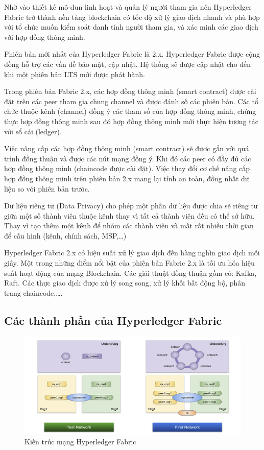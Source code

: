 Nhờ vào thiết kế mô-đun linh hoạt và quản lý người tham gia nên Hyperledger Fabric trở thành nền tảng blockchain có tốc độ xử lý giao dịch nhanh và phù hợp với tổ chức muốn kiểm soát danh tính người tham gia, và xác minh các giao dịch với hợp đồng thông minh.

Phiên bản mới nhất của Hyperledger Fabric là 2.x. Hyperledger Fabric được cộng đồng hỗ trợ các vấn đề bảo mật, cập nhật. Hệ thống sẽ được cập nhật cho đến khi một phiên bản LTS mới được phát hành.


Trong phiên bản Fabric 2.x, các hợp đồng thông minh (smart contract) được cài đặt trên các peer tham gia chung channel và được đánh số các phiên bản. Các tổ chức thuộc kênh (channel) đồng ý các tham số của hợp đồng thông minh, chứng thực hợp đồng thông minh sau đó hợp đồng thông minh mới thực hiện tương tác với sổ cái (ledger).

Việc nâng cấp các hợp đồng thông minh (smart contract) sẽ được gắn với quá trình đồng thuận và được các nút mạng đồng ý. Khi đó các peer có đầy đủ các hợp đồng thông minh (chaincode được cài đặt). Việc thay đổi cơ chế nâng cấp hợp đồng thông minh trên phiên bản 2.x mang lại tính an toàn, đồng nhất dữ liệu so với phiên bản trước.

Dữ liệu riêng tư (Data Privacy) cho phép một phần dữ liệu được chia sẽ riêng tư giữa một số thành viên thuộc kênh thay vì tất cả thành viên đều có thể sở hữu. Thay vì tạo thêm một kênh để nhóm các thành viên và mất rất nhiều thời gian để cấu hình (kênh, chính sách, MSP,…) 

Hyperledger Fabric 2.x có hiệu suất xử lý giao dịch đến hàng nghìn giao dịch mỗi giây. Một trong những điểm nổi bật của phiên bản Fabric 2.x là tối ưu hóa hiệu suất hoạt động của mạng Blockchain. Các giải thuật đồng thuận gồm có: Kafka, Raft. Các thực giao dịch được xử lý song song, xử lý khối bất động bộ, phân trang chaincode,\ldots.

\subsection{Các thành phần của Hyperledger Fabric}

\begin{figure}[htbp]
\centering
\includegraphics[width=.9\linewidth]{img/hlf_network.png}
\caption{Kiến trúc mạng Hyperledger Fabric}
\label{fig:hlf_network}
\end{figure}

